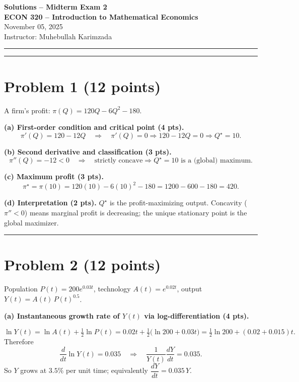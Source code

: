 \documentclass[12pt]{article}
\begin{document}
\begin{center}
{\Large \textbf{Solutions -- Midterm Exam 2}} \\[0.9em]
\textbf{ECON 320 -- Introduction to Mathematical Economics} \\[0.7em]

November 05, 2025
 \\[0.8em]
Instructor: Muhebullah Karimzada
\end{center}

\hrule

\hrule
\vspace{8pt}

\section*{Problem 1  (12 points)}

A firm's profit: \(\pi(Q)=120Q-6Q^2-180\).

\textbf{(a) First-order condition and critical point (4 pts).}
\[
\pi'(Q)=120-12Q \quad\Rightarrow\quad \pi'(Q)=0 \Rightarrow 120-12Q=0 \Rightarrow Q^\star=10.
\]

\textbf{(b) Second derivative and classification (3 pts).}
\[
\pi''(Q)=-12<0 \quad\Rightarrow\quad \text{strictly concave} \Rightarrow Q^\star=10 \text{ is a (global) maximum.}
\]

\textbf{(c) Maximum profit (3 pts).}
\[
\pi^\star=\pi(10)=120(10)-6(10)^2-180=1200-600-180=420.
\]

\textbf{(d) Interpretation (2 pts).}
\(Q^\star\) is the profit-maximizing output. Concavity (\(\pi''<0\)) means marginal profit is decreasing; the unique stationary point is the global maximizer.

\hrule
\vspace{8pt}

\section*{Problem 2 (12 points)}

Population \(P(t)=200 e^{0.03t}\), technology \(A(t)=e^{0.02t}\), output \(Y(t)=A(t)\,P(t)^{0.5}\).

\textbf{(a) Instantaneous growth rate of \(Y(t)\) via log-differentiation (4 pts).}

\[
\ln Y(t)=\ln A(t)+\tfrac{1}{2}\ln P(t)=0.02t+\tfrac{1}{2}\big(\ln 200+0.03t\big)
= \tfrac{1}{2}\ln 200 + (0.02+0.015)t.
\]
Therefore
\[
\frac{d}{dt}\ln Y(t)=0.035 \quad\Rightarrow\quad \frac{1}{Y(t)}\frac{dY}{dt}=0.035.
\]
So \(Y\) grows at \(3.5\%\) per unit time; equivalently \(\dfrac{dY}{dt}=0.035\,Y\).
\end{document}
